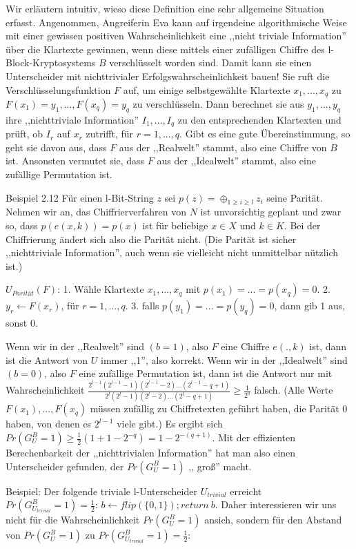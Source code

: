 \documentclass[a4paper]{article}
\begin{document}
\begin{multicols}{3}
        Wir erläutern intuitiv, wieso diese Definition eine sehr allgemeine Situation erfasst. Angenommen, Angreiferin Eva kann auf irgendeine algorithmische Weise mit einer gewissen positiven Wahrscheinlichkeit eine ,,nicht triviale Information'' über die Klartexte gewinnen, wenn diese mittels einer zufälligen Chiffre des l-Block-Kryptosystems $B$ verschlüsselt worden sind. Damit kann sie einen Unterscheider mit nichttrivialer Erfolgswahrscheinlichkeit bauen! Sie ruft die Verschlüsselungsfunktion $F$ auf, um einige selbstgewählte Klartexte $x_1,...,x_q$ zu $F(x_1)=y_1,...,F(x_q)=y_q$ zu verschlüsseln. Dann berechnet sie aus $y_1,...,y_q$ ihre ,,nichttriviale Information'' $I_1,...,I_q$ zu den entsprechenden Klartexten und prüft, ob $I_r$ auf $x_r$ zutrifft, für $r=1,...,q$. Gibt es eine gute Übereinstimmung, so geht sie davon aus, dass $F$ aus der ,,Realwelt'' stammt, also eine Chiffre von $B$ ist. Ansonsten vermutet sie, dass $F$ aus der ,,Idealwelt'' stammt, also eine zufällige Permutation ist.

        Beispiel 2.12 Für einen l-Bit-String $z$ sei $p(z)=\oplus_{1 \geq i\geq l} z_i$ seine Parität. Nehmen wir an, das Chiffrierverfahren von $N$ ist unvorsichtig geplant und zwar so, dass $p(e(x,k)) =p(x)$ ist für beliebige $x\in X$ und $k\in K$. Bei der Chiffrierung ändert sich also die Parität nicht. (Die Parität ist sicher ,,nichttriviale Information'', auch wenn sie vielleicht nicht unmittelbar nützlich ist.)

    $U_{Parität}(F)$:
        1. Wähle Klartexte $x_1,...,x_q$ mit $p(x_1)=...=p(x_q) = 0$.
        2. $y_r\leftarrow F(x_r)$, für $r=1,...,q$.
        3. falls $p(y_1)=...=p(y_q)=0$, dann gib 1 aus, sonst 0.

        Wenn wir in der  ,,Realwelt''  sind $(b=1)$, also $F$ eine Chiffre $e(.,k)$ ist, dann ist die Antwort von $U$ immer ,,1'', also korrekt. Wenn wir in der ,,Idealwelt'' sind $(b=0)$, also $F$ eine zufällige Permutation ist, dann ist die Antwort nur mit Wahrscheinlichkeit $\frac{2^{l-1} (2^{l-1} -1)(2^{l-1}-2)...(2^{l-1} -q+ 1)}{2^l (2^l-1)(2^l-2)...(2^l-q+ 1)} \geq \frac{1}{2^q}$ falsch. (Alle Werte $F(x_1),...,F(x_q)$ müssen zufällig zu Chiffretexten geführt haben, die Parität 0 haben, von denen es $2^{l-1}$ viele gibt.) Es ergibt sich $Pr(G^B_U= 1)\geq\frac{1}{2} (1+1-2^{-q}) =1-2^{-(q+1)}$. Mit der effizienten Berechenbarkeit der ,,nichttrivialen Information'' hat man also einen Unterscheider gefunden, der $Pr(G^B_U=1)$ ,, groß'' macht.

        Beispiel: Der folgende triviale l-Unterscheider $U_{trivial}$ erreicht $Pr(G^B_{U_{trivial}}= 1)=\frac{1}{2}$: $b\leftarrow flip(\{0,1\}); return\ b$.
        Daher interessieren wir uns nicht für die Wahrscheinlichkeit $Pr(G^B_U= 1)$ ansich, sondern für den Abstand von $Pr(G^B_U=1)$ zu $Pr(G^B_{U_{trivial}}= 1) =\frac{1}{2}$:


\end{multicols}
\end{document}
